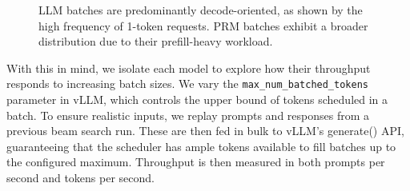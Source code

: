\documentclass[11pt,twoside]{report}
\begin{document}
\begin{figure}[htbp]
\centering
{}
\vspace{1em}
\caption{LLM batches are predominantly decode-oriented, as shown by the high frequency of 1-token requests. PRM batches exhibit a broader distribution due to their prefill-heavy workload.}
\label{fig:batch-hist-comparison}
\end{figure}

With this in mind, we isolate each model to explore how their throughput responds to increasing batch sizes. 
We vary the \texttt{max\_num\_batched\_tokens} parameter in vLLM, which controls the upper bound of tokens scheduled in a batch. 
To ensure realistic inputs, we replay prompts and responses from a previous beam search run. 
These are then fed in bulk to vLLM's generate() API, guaranteeing that the scheduler has ample tokens available to fill batches up to the configured maximum. 
Throughput is then measured in both prompts per second and tokens per second.
\end{document}
